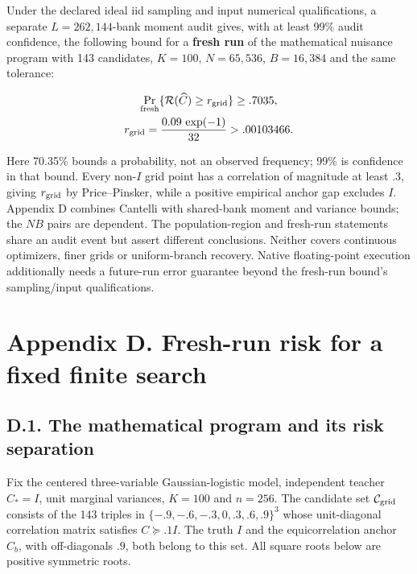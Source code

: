 \documentclass{article}
\begin{document}
Under the declared ideal iid sampling and input numerical
qualifications, a separate \(L=262{,}144\)-bank moment audit gives, with
at least 99\% audit confidence, the following bound for a \textbf{fresh
run} of the mathematical nuisance program with 143 candidates,
\(K=100\), \(N=65{,}536\), \(B=16{,}384\) and the same tolerance:

\[
\begin{gathered}
\Pr_{\rm fresh}\{\mathcal R(\widehat C)\ge r_{\rm grid}\}\ge .7035,\\
r_{\rm grid}=\frac{0.09\,\exp(-1)}{32}>.00103466.
\end{gathered}
\]

Here 70.35\% bounds a probability, not an observed frequency; 99\% is
confidence in that bound. Every non-\(I\) grid point has a correlation
of magnitude at least .3, giving \(r_{\rm grid}\) by Price--Pinsker,
while a positive empirical anchor gap excludes \(I\). Appendix D
combines Cantelli with shared-bank moment and variance bounds; the
\(NB\) pairs are dependent. The population-region and fresh-run
statements share an audit event but assert different conclusions.
Neither covers continuous optimizers, finer grids or uniform-branch
recovery. Native floating-point execution additionally needs a
future-run error guarantee beyond the fresh-run bound's sampling/input
qualifications.

\clearpage

\section*{Appendix D. Fresh-run risk for a fixed finite
search}\label{appendix-d.-fresh-run-risk-for-a-fixed-finite-search}

\subsection*{D.1. The mathematical program and its risk
separation}\label{d.1.-the-mathematical-program-and-its-risk-separation}

Fix the centered three-variable Gaussian-logistic model, independent
teacher \(C_*=I\), unit marginal variances, \(K=100\) and \(n=256\). The
candidate set \(\mathcal C_{\rm grid}\) consists of the 143 triples in
\(\{-.9,-.6,-.3,0,.3,.6,.9\}^3\) whose unit-diagonal correlation matrix
satisfies \(C\succeq.1I\). The truth \(I\) and the equicorrelation
anchor \(C_b\), with off-diagonals \(.9\), both belong to this set. All
square roots below are positive symmetric roots.
\end{document}
